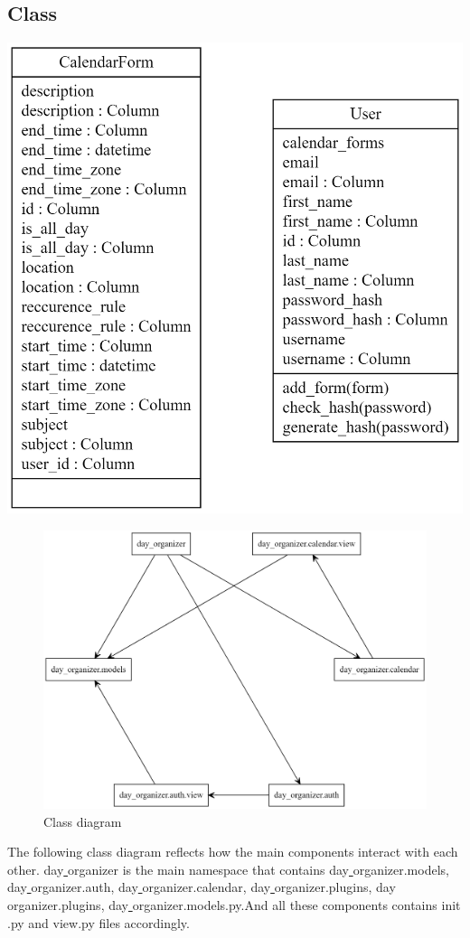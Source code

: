 \subsection{Class}
\par
\includegraphics[width=\textwidth]{ClassDigram2}
\par 
\begin{figure}[htbp]
	\includegraphics[width=\textwidth] {ClassDigram3}
	\caption{Class diagram}	
\end{figure}

\par The following class diagram reflects how the main components interact with each other. day\underline{ }organizer is the main namespace that contains day\underline{ }organizer.models, day\underline{ }organizer.auth, day\underline{ }organizer.calendar, day\underline{ }organizer.plugins, day\underline{ }organizer.plugins, day\underline{ }organizer.models.py.And all these components contains \underline{ }init\underline{ }.py and view.py files accordingly.


\clearpage